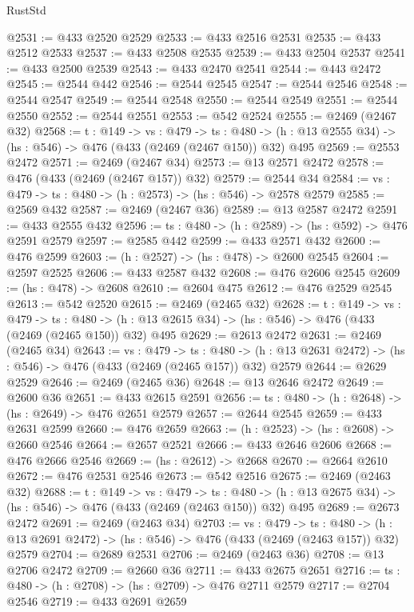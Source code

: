 \begin{lexlean}{RustStd}
\begin{coremodule}
@2531 := @433 @2520 @2529
@2533 := @433 @2516 @2531
@2535 := @433 @2512 @2533
@2537 := @433 @2508 @2535
@2539 := @433 @2504 @2537
@2541 := @433 @2500 @2539
@2543 := @433 @2470 @2541
@2544 := @443 @2472
@2545 := @2544 @442
@2546 := @2544 @2545
@2547 := @2544 @2546
@2548 := @2544 @2547
@2549 := @2544 @2548
@2550 := @2544 @2549
@2551 := @2544 @2550
@2552 := @2544 @2551
@2553 := @542 @2524
@2555 := @2469 (@2467 @32)
@2568 := {t : @149} ->
  {vs : @479} ->
  {ts : @480} -> (h : @13 @2555 @34) -> (hs : @546) -> @476 (@433 (@2469 (@2467 @150)) @32) @495
@2569 := @2553 @2472
@2571 := @2469 (@2467 @34)
@2573 := @13 @2571 @2472
@2578 := @476 (@433 (@2469 (@2467 @157)) @32)
@2579 := @2544 @34
@2584 := {vs : @479} -> {ts : @480} -> (h : @2573) -> (hs : @546) -> @2578 @2579
@2585 := @2569 @432
@2587 := @2469 (@2467 @36)
@2589 := @13 @2587 @2472
@2591 := @433 @2555 @432
@2596 := {ts : @480} -> (h : @2589) -> (hs : @592) -> @476 @2591 @2579
@2597 := @2585 @442
@2599 := @433 @2571 @432
@2600 := @476 @2599
@2603 := (h : @2527) -> (hs : @478) -> @2600 @2545
@2604 := @2597 @2525
@2606 := @433 @2587 @432
@2608 := @476 @2606 @2545
@2609 := (hs : @478) -> @2608
@2610 := @2604 @475
@2612 := @476 @2529 @2545
@2613 := @542 @2520
@2615 := @2469 (@2465 @32)
@2628 := {t : @149} ->
  {vs : @479} ->
  {ts : @480} -> (h : @13 @2615 @34) -> (hs : @546) -> @476 (@433 (@2469 (@2465 @150)) @32) @495
@2629 := @2613 @2472
@2631 := @2469 (@2465 @34)
@2643 := {vs : @479} ->
  {ts : @480} -> (h : @13 @2631 @2472) -> (hs : @546) -> @476 (@433 (@2469 (@2465 @157)) @32) @2579
@2644 := @2629 @2529
@2646 := @2469 (@2465 @36)
@2648 := @13 @2646 @2472
@2649 := @2600 @36
@2651 := @433 @2615 @2591
@2656 := {ts : @480} -> (h : @2648) -> (hs : @2649) -> @476 @2651 @2579
@2657 := @2644 @2545
@2659 := @433 @2631 @2599
@2660 := @476 @2659
@2663 := (h : @2523) -> (hs : @2608) -> @2660 @2546
@2664 := @2657 @2521
@2666 := @433 @2646 @2606
@2668 := @476 @2666 @2546
@2669 := (hs : @2612) -> @2668
@2670 := @2664 @2610
@2672 := @476 @2531 @2546
@2673 := @542 @2516
@2675 := @2469 (@2463 @32)
@2688 := {t : @149} ->
  {vs : @479} ->
  {ts : @480} -> (h : @13 @2675 @34) -> (hs : @546) -> @476 (@433 (@2469 (@2463 @150)) @32) @495
@2689 := @2673 @2472
@2691 := @2469 (@2463 @34)
@2703 := {vs : @479} ->
  {ts : @480} -> (h : @13 @2691 @2472) -> (hs : @546) -> @476 (@433 (@2469 (@2463 @157)) @32) @2579
@2704 := @2689 @2531
@2706 := @2469 (@2463 @36)
@2708 := @13 @2706 @2472
@2709 := @2660 @36
@2711 := @433 @2675 @2651
@2716 := {ts : @480} -> (h : @2708) -> (hs : @2709) -> @476 @2711 @2579
@2717 := @2704 @2546
@2719 := @433 @2691 @2659

\end{coremodule}
\end{lexlean}
